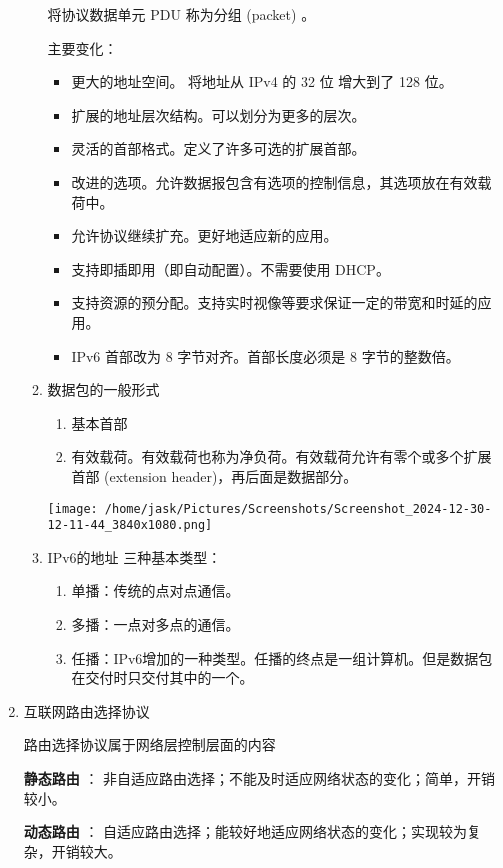 \documentclass[11pt]{article}
\begin{document}
\begin{enumerate}
\begin{enumerate}
将协议数据单元 PDU 称为分组 (packet) 。

主要变化：
\begin{itemize}
\item 更大的地址空间。 将地址从 IPv4 的 32 位 增大到了 128 位。
\item 扩展的地址层次结构。可以划分为更多的层次。
\item 灵活的首部格式。定义了许多可选的扩展首部。
\item 改进的选项。允许数据报包含有选项的控制信息，其选项放在有效载荷中。
\item 允许协议继续扩充。更好地适应新的应用。
\item 支持即插即用（即自动配置）。不需要使用 DHCP。
\item 支持资源的预分配。支持实时视像等要求保证一定的带宽和时延的应用。
\item IPv6 首部改为 8 字节对齐。首部长度必须是 8 字节的整数倍。
\end{itemize}
\item 数据包的一般形式
\label{sec:org9f1bf12}
\begin{enumerate}
\item 基本首部
\item 有效载荷。有效载荷也称为净负荷。有效载荷允许有零个或多个扩展首部 (extension header)，再后面是数据部分。
\end{enumerate}

\begin{center}
\texttt{[image: /home/jask/Pictures/Screenshots/Screenshot\_2024-12-30-12-11-44\_3840x1080.png]}
\end{center}
\item IPv6的地址
\label{sec:org2f8b6e9}
三种基本类型：
\begin{enumerate}
\item 单播：传统的点对点通信。
\item 多播：一点对多点的通信。
\item 任播：IPv6增加的一种类型。任播的终点是一组计算机。但是数据包在交付时只交付其中的一个。
\end{enumerate}
\end{enumerate}
\item 互联网路由选择协议
\label{sec:orgb0e88c0}

路由选择协议属于网络层控制层面的内容

\textbf{静态路由} ： 非自适应路由选择；不能及时适应网络状态的变化；简单，开销较小。

\textbf{动态路由} ： 自适应路由选择；能较好地适应网络状态的变化；实现较为复杂，开销较大。


\end{enumerate}
\end{document}
